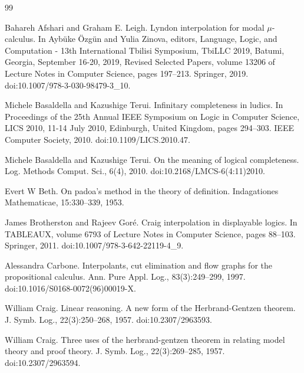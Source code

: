 \begin{thebibliography}{99}
\par\noindent    Bahareh Afshari and Graham E. Leigh.  Lyndon interpolation for modal $\mu$-calculus.  In Aybüke Özgün and Yulia Zinova, editors, Language, Logic, and Computation - 13th International Tbilisi Symposium, TbiLLC 2019, Batumi, Georgia, September 16-20, 2019, Revised Selected Papers, volume 13206 of Lecture Notes in Computer Science, pages 197–213. Springer, 2019.  doi:10.1007/978-3-030-98479-3\_10.  

\par\noindent    Michele Basaldella and Kazushige Terui.  Infinitary completeness in ludics.  In Proceedings of the 25th Annual IEEE Symposium on Logic in Computer Science, LICS 2010, 11-14 July 2010, Edinburgh, United Kingdom, pages 294–303. IEEE Computer Society, 2010.  doi:10.1109/LICS.2010.47.  

\par\noindent    Michele Basaldella and Kazushige Terui.  On the meaning of logical completeness.  Log. Methods Comput. Sci., 6(4), 2010.  doi:10.2168/LMCS-6(4:11)2010.  

\par\noindent    Evert W Beth.  On padoa’s method in the theory of definition.  Indagationes Mathematicae, 15:330–339, 1953.  

\par\noindent    James Brotherston and Rajeev Goré.  Craig interpolation in displayable logics.  In TABLEAUX, volume 6793 of Lecture Notes in Computer Science, pages 88–103. Springer, 2011.  doi:10.1007/978-3-642-22119-4\_9.  

\par\noindent    Alessandra Carbone.  Interpolants, cut elimination and flow graphs for the propositional calculus.  Ann. Pure Appl. Log., 83(3):249–299, 1997.  doi:10.1016/S0168-0072(96)00019-X.  

\par\noindent    William Craig.  Linear reasoning. A new form of the Herbrand-Gentzen theorem.  J. Symb. Log., 22(3):250–268, 1957.  doi:10.2307/2963593.  

\par\noindent    William Craig.  Three uses of the herbrand-gentzen theorem in relating model theory and proof theory.  J. Symb. Log., 22(3):269–285, 1957.  doi:10.2307/2963594.  


\end{thebibliography}
